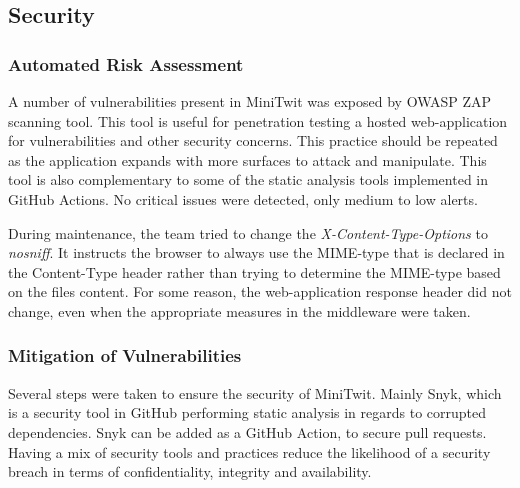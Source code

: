 \subsection{Security}
\subsubsection{Automated Risk Assessment}
A number of vulnerabilities present in MiniTwit was exposed by OWASP ZAP scanning tool. This tool is useful for penetration testing a hosted web-application for vulnerabilities and other security concerns. This practice should be repeated as the application expands with more surfaces to attack and manipulate. This tool is also complementary to some of the static analysis tools implemented in GitHub Actions. No critical issues were detected, only medium to low alerts.

During maintenance, the team tried to change the \textit{X-Content-Type-Options} to \textit{nosniff}. It instructs the browser to always use the MIME-type that is declared in the Content-Type header rather than trying to determine the MIME-type based on the files content. For some reason, the web-application response header did not change, even when the appropriate measures in the middleware were taken. 
    
\subsubsection{Mitigation of Vulnerabilities}
Several steps were taken to ensure the security of MiniTwit. Mainly Snyk, which is a security tool in GitHub performing static analysis in regards to corrupted dependencies. Snyk can be added as a GitHub Action, to secure pull requests. Having a mix of security tools and practices reduce the likelihood of a security breach in terms of confidentiality, integrity and availability. 